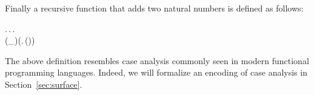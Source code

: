 Finally a recursive function that adds two natural numbers is defined
as follows:
\begin{hscode}\SaveRestoreHook
{}%
%
%
%
\>[3]{}\mu\;\mathbin{:}\to {}\to {}.\,\lambda {}\mathbin{:}.\,\lambda {}\mathbin{:}.\,{}\<[E]%
\\
\>[3]{}\<[7]%
\>[7]{}(_\downarrow\;)\;\;\;(\lambda {}\mathbin{:}.\,\;(\;\;)){}\<[E]%
\ColumnHook
\end{hscode}\resethooks
The above definition resembles case analysis commonly seen in
modern functional programming languages.
Indeed, we will formalize an encoding of 
case analysis in Section~\ref{sec:surface}.



